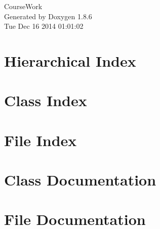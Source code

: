 \documentclass[twoside]{book}
\newcommand{\clearemptydoublepage}{%
  \newpage{\pagestyle{empty}\cleardoublepage}%
}
\begin{document}
\hypersetup{pageanchor=false}
\begin{titlepage}
\vspace*{7cm}
\begin{center}%
{\Large Course\-Work }\\
\vspace*{1cm}
{\large Generated by Doxygen 1.8.6}\\
\vspace*{0.5cm}
{\small Tue Dec 16 2014 01:01:02}\\
\end{center}
\end{titlepage}
\clearemptydoublepage
\tableofcontents
\clearemptydoublepage
{}
\hypersetup{pageanchor=true}

\chapter{Hierarchical Index}

\chapter{Class Index}

\chapter{File Index}

\chapter{Class Documentation}














\chapter{File Documentation}



























\newpage
{}
{}
\printindex
\end{document}
